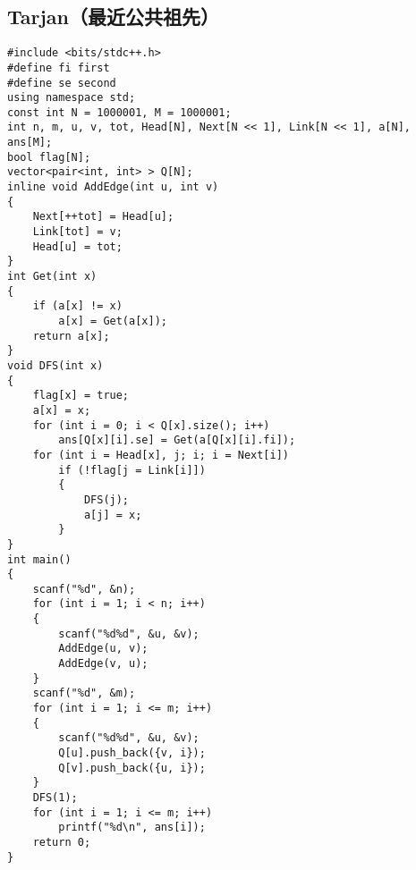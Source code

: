 \documentclass[a4paper]{article}
\begin{document}
\subsection{Tarjan（最近公共祖先）}
\begin{lstlisting}
#include <bits/stdc++.h>
#define fi first
#define se second
using namespace std;
const int N = 1000001, M = 1000001;
int n, m, u, v, tot, Head[N], Next[N << 1], Link[N << 1], a[N], ans[M];
bool flag[N];
vector<pair<int, int> > Q[N];
inline void AddEdge(int u, int v)
{
    Next[++tot] = Head[u];
    Link[tot] = v;
    Head[u] = tot;
}
int Get(int x)
{
    if (a[x] != x)
        a[x] = Get(a[x]);
    return a[x];
}
void DFS(int x)
{
    flag[x] = true;
    a[x] = x;
    for (int i = 0; i < Q[x].size(); i++)
        ans[Q[x][i].se] = Get(a[Q[x][i].fi]);
    for (int i = Head[x], j; i; i = Next[i])
        if (!flag[j = Link[i]])
        {
            DFS(j);
            a[j] = x;
        }
}
int main()
{
    scanf("%d", &n);
    for (int i = 1; i < n; i++)
    {
        scanf("%d%d", &u, &v);
        AddEdge(u, v);
        AddEdge(v, u);
    }
    scanf("%d", &m);
    for (int i = 1; i <= m; i++)
    {
        scanf("%d%d", &u, &v);
        Q[u].push_back({v, i});
        Q[v].push_back({u, i});
    }
    DFS(1);
    for (int i = 1; i <= m; i++)
        printf("%d\n", ans[i]);
    return 0;
}
\end{lstlisting}
\end{document}

